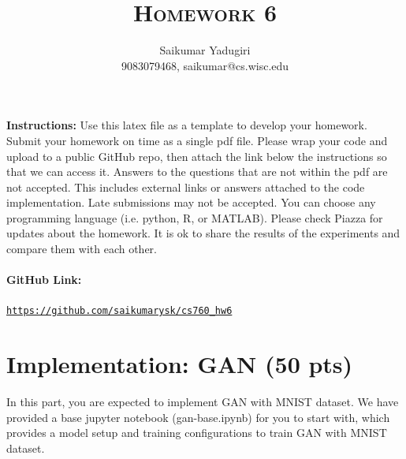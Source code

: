 \documentclass[a4paper]{article}
\title{\textsc{Homework 6}} %
\author{
	Saikumar Yadugiri\\
	9083079468, saikumar@cs.wisc.edu\\
}
\date{}
\theoremstyle{definition}
\begin{document}
	
	\maketitle 
	
        \textbf{Instructions:}
        Use this latex file as a template to develop your homework. Submit your homework on time as a single pdf file. Please wrap your code and upload to a public GitHub repo, then attach the link below the instructions so that we can access it. Answers to the questions that are not within the pdf are not accepted. This includes external links or answers attached to the code implementation. Late submissions may not be accepted. You can choose any programming language (i.e. python, R, or MATLAB). Please check Piazza for updates about the homework. It is ok to share the results of the experiments and compare them with each other.

        \paragraph{GitHub Link:} \href{https://github.com/saikumarysk/cs760_hw6}{\texttt{https://github.com/saikumarysk/cs760\_hw6}}
	
	\section{Implementation: GAN (50 pts)}
	In this part, you are expected to implement GAN with MNIST dataset. We have provided a base jupyter notebook (gan-base.ipynb) for you to start with, which provides a model setup and training configurations to train GAN with MNIST dataset.
	
\end{document}
